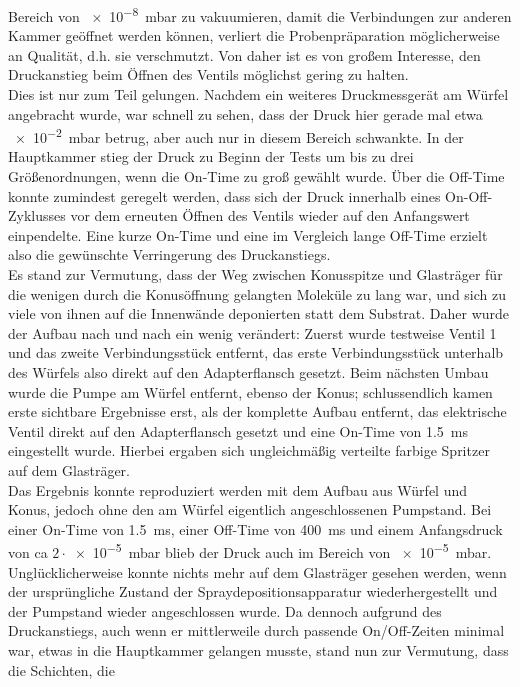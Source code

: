 Bereich von \SI{e-8}{mbar} zu vakuumieren, damit die Verbindungen zur anderen Kammer geöffnet werden
können, verliert die Probenpräparation möglicherweise an Qualität, d.h. sie verschmutzt. Von daher
ist es von großem Interesse, den Druckanstieg beim Öffnen des Ventils möglichst gering zu halten.
\\
Dies ist nur zum Teil gelungen. Nachdem ein weiteres Druckmessgerät am Würfel angebracht wurde, war
schnell zu sehen, dass der Druck hier gerade mal etwa \SI{e-2}{mbar} betrug, aber auch nur in diesem
Bereich schwankte. In der Hauptkammer stieg der Druck zu Beginn der Tests um bis zu drei
Größenordnungen, wenn die On-Time zu groß gewählt wurde. Über die Off-Time konnte zumindest geregelt werden, dass sich der
Druck innerhalb eines On-Off-Zyklusses vor dem erneuten Öffnen des Ventils wieder auf den
Anfangswert einpendelte. Eine kurze On-Time und eine im Vergleich lange
Off-Time erzielt also die gewünschte Verringerung des Druckanstiegs.
\\
Es stand zur Vermutung, dass der Weg zwischen Konusspitze und Glasträger für die wenigen durch die
Konusöffnung gelangten Moleküle zu lang war, und sich zu viele von ihnen auf die Innenwände
deponierten statt dem Substrat. Daher wurde der Aufbau nach und nach ein wenig verändert:
Zuerst wurde testweise Ventil 1 und das zweite Verbindungsstück entfernt, das erste Verbindungsstück
unterhalb des Würfels also direkt auf den Adapterflansch gesetzt. Beim nächsten Umbau wurde die
Pumpe am Würfel entfernt, ebenso der Konus; schlussendlich kamen erste sichtbare Ergebnisse erst,
als der komplette Aufbau entfernt, das elektrische Ventil direkt auf den
Adapterflansch gesetzt und eine On-Time von \SI{1,5}{ms} eingestellt wurde. Hierbei ergaben sich
ungleichmäßig verteilte farbige Spritzer auf dem Glasträger.
\\
Das Ergebnis konnte reproduziert werden mit dem Aufbau aus Würfel und Konus, jedoch ohne den am
Würfel eigentlich angeschlossenen Pumpstand. Bei einer On-Time von \SI{1,5}{ms}, einer Off-Time von
\SI{400}{ms} und einem Anfangsdruck von ca $2\cdot$\SI{e-5}{mbar} blieb der Druck auch im Bereich von
\SI{e-5}{mbar}.
\\
Unglücklicherweise konnte nichts mehr auf dem Glasträger gesehen werden, wenn der ursprüngliche
Zustand der Spraydepositionsapparatur wiederhergestellt und der Pumpstand wieder angeschlossen
wurde.
Da dennoch aufgrund des Druckanstiegs, auch wenn er mittlerweile durch passende On/Off-Zeiten minimal
war, etwas in die Hauptkammer gelangen musste, stand nun zur Vermutung, dass die Schichten, die
